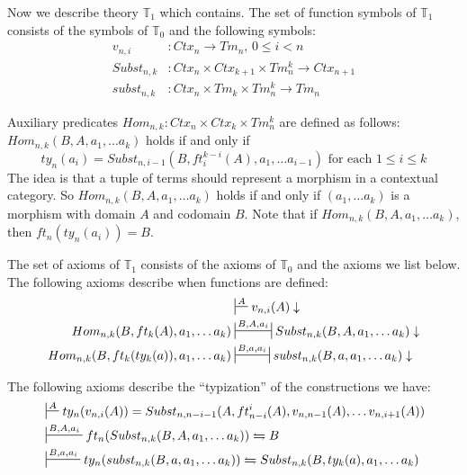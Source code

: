 \documentclass{amsart}
\theoremstyle{definition}
\theoremstyle{remark}
\numberwithin{figure}{section}
\begin{document}
Now we describe theory $\mathbb{T}_1$ which contains.
The set of function symbols of $\mathbb{T}_1$ consists of the symbols of $\mathbb{T}_0$ and the following symbols:
\begin{align*}
v_{n,i}     & : Ctx_n \to Tm_n \text{, } 0 \leq i < n \\
Subst_{n,k} & : Ctx_n \times Ctx_{k+1} \times Tm_n^k \to Ctx_{n+1} \\
subst_{n,k} & : Ctx_n \times Tm_k \times Tm_n^k \to Tm_n
\end{align*}

Auxiliary predicates $Hom_{n,k} : Ctx_n \times Ctx_k \times Tm_n^k$ are defined as follows: $Hom_{n,k}(B, A, a_1, \ldots a_k)$ holds if and only if
\[ ty_n(a_i) = Subst_{n,i-1}(B, ft^{k-i}_i(A), a_1, \ldots a_{i-1}) \text{ for each } 1 \leq i \leq k \]
The idea is that a tuple of terms should represent a morphism in a contextual category.
So $Hom_{n,k}(B, A, a_1, \ldots a_k)$ holds if and only if $(a_1, \ldots a_k)$ is a morphism with domain $A$ and codomain $B$.
Note that if $Hom_{n,k}(B, A, a_1, \ldots a_k)$, then $ft_n(ty_n(a_i)) = B$.

The set of axioms of $\mathbb{T}_1$ consists of the axioms of $\mathbb{T}_0$ and the axioms we list below.
The following axioms describe when functions are defined:
\begin{align}
\label{ax:def-var}
                                             & \sststile{}{A}           v_{n,i}(A) \downarrow \\
\label{ax:def-Subst}
Hom_{n,k}(B, ft_k(A), a_1, \ldots a_k)       & \ssststile{}{B, A, a_i}  Subst_{n,k}(B, A, a_1, \ldots a_k) \downarrow \\
\label{ax:def-subst}
Hom_{n,k}(B, ft_k(ty_k(a)), a_1, \ldots a_k) & \ssststile{}{B, a, a_i}  subst_{n,k}(B, a, a_1, \ldots a_k) \downarrow
\end{align}

The following axioms describe the ``typization'' of the constructions we have:
\begin{align}
\label{ax:type-var}
& \sststile{}{A}         ty_n(v_{n,i}(A)) = Subst_{n,n-i-1}(A, ft^i_{n-i}(A), v_{n,n-1}(A), \ldots v_{n,i+1}(A)) \\
\label{ax:type-Subst}
& \sststile{}{B, A, a_i} ft_n(Subst_{n,k}(B, A, a_1, \ldots a_k)) \leftrightharpoons B \\
\label{ax:type-subst}
& \sststile{}{B, a, a_i} ty_n(subst_{n,k}(B, a, a_1, \ldots a_k)) \leftrightharpoons Subst_{n,k}(B, ty_k(a), a_1, \ldots a_k)
\end{align}
\end{document}
